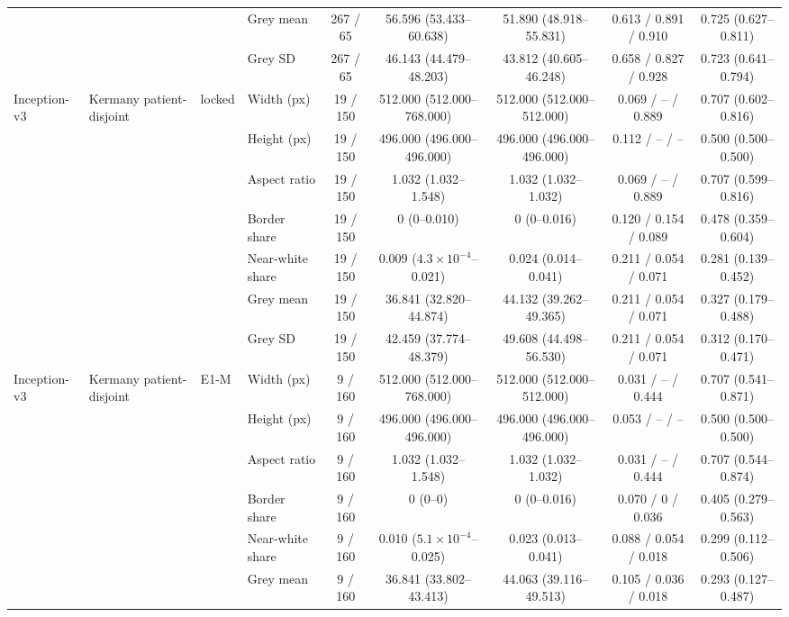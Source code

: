 \begin{longtable}{@{}llllccccc@{}}
 &  &  & Grey mean & 267 / 65 & 56.596 (53.433--60.638) & 51.890 (48.918--55.831) & 0.613 / 0.891 / 0.910 & 0.725 (0.627--0.811) \\
 &  &  & Grey SD & 267 / 65 & 46.143 (44.479--48.203) & 43.812 (40.605--46.248) & 0.658 / 0.827 / 0.928 & 0.723 (0.641--0.794) \\
\addlinespace[1pt]
Inception-v3 & Kermany patient-disjoint & locked & Width (px) & 19 / 150 & 512.000 (512.000--768.000) & 512.000 (512.000--512.000) & 0.069 / -- / 0.889 & 0.707 (0.602--0.816) \\
 &  &  & Height (px) & 19 / 150 & 496.000 (496.000--496.000) & 496.000 (496.000--496.000) & 0.112 / -- / -- & 0.500 (0.500--0.500) \\
 &  &  & Aspect ratio & 19 / 150 & 1.032 (1.032--1.548) & 1.032 (1.032--1.032) & 0.069 / -- / 0.889 & 0.707 (0.599--0.816) \\
 &  &  & Border share & 19 / 150 & 0 (0--0.010) & 0 (0--0.016) & 0.120 / 0.154 / 0.089 & 0.478 (0.359--0.604) \\
 &  &  & Near-white share & 19 / 150 & 0.009 ($4.3\times10^{-4}$--0.021) & 0.024 (0.014--0.041) & 0.211 / 0.054 / 0.071 & 0.281 (0.139--0.452) \\
 &  &  & Grey mean & 19 / 150 & 36.841 (32.820--44.874) & 44.132 (39.262--49.365) & 0.211 / 0.054 / 0.071 & 0.327 (0.179--0.488) \\
 &  &  & Grey SD & 19 / 150 & 42.459 (37.774--48.379) & 49.608 (44.498--56.530) & 0.211 / 0.054 / 0.071 & 0.312 (0.170--0.471) \\
\addlinespace[1pt]
Inception-v3 & Kermany patient-disjoint & E1-M & Width (px) & 9 / 160 & 512.000 (512.000--768.000) & 512.000 (512.000--512.000) & 0.031 / -- / 0.444 & 0.707 (0.541--0.871) \\
 &  &  & Height (px) & 9 / 160 & 496.000 (496.000--496.000) & 496.000 (496.000--496.000) & 0.053 / -- / -- & 0.500 (0.500--0.500) \\
 &  &  & Aspect ratio & 9 / 160 & 1.032 (1.032--1.548) & 1.032 (1.032--1.032) & 0.031 / -- / 0.444 & 0.707 (0.544--0.874) \\
 &  &  & Border share & 9 / 160 & 0 (0--0) & 0 (0--0.016) & 0.070 / 0 / 0.036 & 0.405 (0.279--0.563) \\
 &  &  & Near-white share & 9 / 160 & 0.010 ($5.1\times10^{-4}$--0.025) & 0.023 (0.013--0.041) & 0.088 / 0.054 / 0.018 & 0.299 (0.112--0.506) \\
 &  &  & Grey mean & 9 / 160 & 36.841 (33.802--43.413) & 44.063 (39.116--49.513) & 0.105 / 0.036 / 0.018 & 0.293 (0.127--0.487) \\

\end{longtable}

